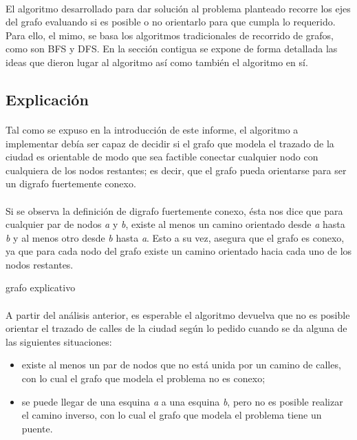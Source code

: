 \paragraph{}
El algoritmo desarrollado para dar solución al problema planteado recorre los ejes del grafo evaluando si es posible o no orientarlo para que cumpla lo requerido. Para ello, el mimo, se basa los algoritmos tradicionales de recorrido de grafos, como son BFS y DFS. En la sección contigua se expone de forma detallada las ideas que dieron lugar al algoritmo así como también el algoritmo en sí.

	
\subsection{Explicación}
\label{exp2}

\paragraph{}
Tal como se expuso en la introducción de este informe, el algoritmo a implementar debía ser capaz de decidir si el grafo que modela el trazado de la ciudad es orientable de modo que sea factible conectar cualquier nodo con cualquiera de los nodos restantes; es decir, que el grafo pueda orientarse para ser un digrafo fuertemente conexo.

\paragraph{}
Si se observa la definición de digrafo fuertemente conexo, ésta nos dice que para cualquier par de nodos \textit{a} y \textit{b}, existe al menos un camino orientado desde \textit{a} hasta \textit{b} y al menos otro desde \textit{b} hasta \textit{a}. Esto a su vez, asegura que el grafo es conexo, ya que para cada nodo del grafo existe un camino orientado hacia cada uno de los nodos restantes.

\begin{center}
grafo explicativo
\end{center}

\paragraph{}
A partir del análisis anterior, es esperable el algoritmo devuelva que no es posible orientar el trazado de calles de la ciudad según lo pedido cuando se da alguna de las siguientes situaciones: 
\begin{itemize}
	\item existe al menos un par de nodos que no está unida por un camino de calles, con lo cual el grafo que modela el problema no es conexo;
	\item se puede llegar de una esquina \textit{a} a una esquina \textit{b}, pero no es posible realizar el camino inverso, con lo cual el grafo que modela el problema tiene un puente.
\end{itemize}

